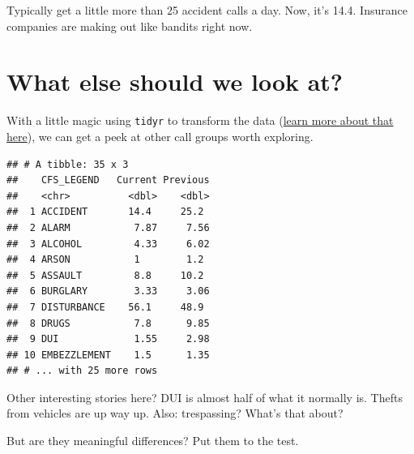 \documentclass[]{book}
\newenvironment{Shaded}{\begin{snugshade}}{\end{snugshade}}
\newcommand{\DataTypeTok}[1]{\textcolor[rgb]{0.13,0.29,0.53}{#1}}
\newcommand{\DecValTok}[1]{\textcolor[rgb]{0.00,0.00,0.81}{#1}}
\newcommand{\KeywordTok}[1]{\textcolor[rgb]{0.13,0.29,0.53}{\textbf{#1}}}
\newcommand{\NormalTok}[1]{#1}
\newcommand{\OperatorTok}[1]{\textcolor[rgb]{0.81,0.36,0.00}{\textbf{#1}}}
\newcommand{\StringTok}[1]{\textcolor[rgb]{0.31,0.60,0.02}{#1}}
\begin{document}
Typically get a little more than 25 accident calls a day. Now, it's 14.4. Insurance companies are making out like bandits right now.

\hypertarget{what-else-should-we-look-at}{%
\section{What else should we look at?}\label{what-else-should-we-look-at}}

With a little magic using \texttt{tidyr} to transform the data (\href{http://mattwaite.github.io/sports/transforming-data.html}{learn more about that here}), we can get a peek at other call groups worth exploring.

\begin{Shaded}
\end{Shaded}

\begin{verbatim}
## # A tibble: 35 x 3
##    CFS_LEGEND   Current Previous
##    <chr>          <dbl>    <dbl>
##  1 ACCIDENT       14.4     25.2 
##  2 ALARM           7.87     7.56
##  3 ALCOHOL         4.33     6.02
##  4 ARSON           1        1.2 
##  5 ASSAULT         8.8     10.2 
##  6 BURGLARY        3.33     3.06
##  7 DISTURBANCE    56.1     48.9 
##  8 DRUGS           7.8      9.85
##  9 DUI             1.55     2.98
## 10 EMBEZZLEMENT    1.5      1.35
## # ... with 25 more rows
\end{verbatim}

Other interesting stories here? DUI is almost half of what it normally is. Thefts from vehicles are up way up. Also: trespassing? What's that about?

But are they meaningful differences? Put them to the test.
\end{document}
